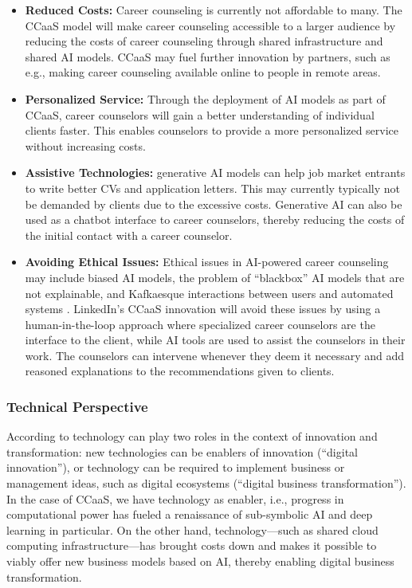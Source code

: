 \begin{itemize}
    \item \textbf{Reduced Costs:} Career counseling is currently not affordable to many. The CCaaS model
        will make career counseling accessible to a larger audience by reducing the costs of career
        counseling through shared infrastructure and shared AI models. CCaaS may fuel further innovation by 
        partners, such as e.g., making career counseling available online to people in remote areas.
    \item \textbf{Personalized Service:} Through the deployment of AI models as part of CCaaS, career counselors 
        will gain a better understanding of individual clients faster. This enables counselors to provide
        a more personalized service without increasing costs.
    \item \textbf{Assistive Technologies:} generative AI models can help job market entrants to write better CVs
        and application letters. This may currently typically not be demanded by clients due to the excessive costs.
        Generative AI can also be used as a chatbot interface to career counselors, thereby reducing the costs
        of the initial contact with a career counselor.
    \item \textbf{Avoiding Ethical Issues:} Ethical issues in AI-powered career counseling may include biased AI
        models, the problem of ``blackbox'' AI models that are not explainable, and Kafkaesque interactions between
        users and automated systems \citep{kaserAIpoweredCareerCounseling2023}. LinkedIn's CCaaS innovation will avoid 
        these issues by using a human-in-the-loop approach where specialized career counselors are the interface 
        to the client, while AI tools are used to assist the counselors in their work. The counselors can intervene
        whenever they deem it necessary and add reasoned explanations to the recommendations given to clients.
\end{itemize}


\subsubsection{Technical Perspective}

According to \cite{dornbergerDigitalInnovationDigital2021} technology can play two roles in the context of innovation
and transformation: new technologies can be enablers of innovation (``digital innovation''), or technology can be 
required to implement business or management ideas, such as digital ecosystems (``digital business transformation'').
In the case of CCaaS, we have technology as enabler, i.e., progress in computational power has fueled a renaissance
of sub-symbolic AI and deep learning in particular. On the other hand, technology---such as shared cloud computing
infrastructure---has brought costs down and makes it possible to viably offer new business models based on AI,
thereby enabling digital business transformation.

